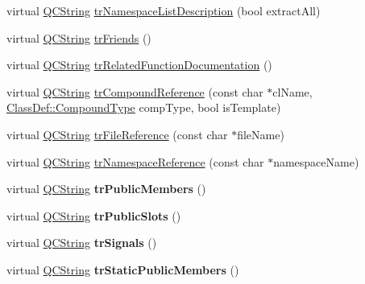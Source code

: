 \begin{DoxyCompactItemize}
\item 
virtual \hyperlink{class_q_c_string}{Q\-C\-String} \hyperlink{class_translator_slovak_aeb5226ccdd672b54940c1705029367da}{tr\-Namespace\-List\-Description} (bool extract\-All)
\item 
virtual \hyperlink{class_q_c_string}{Q\-C\-String} \hyperlink{class_translator_slovak_a77493be94d937cfe7458c6317d792eb6}{tr\-Friends} ()
\item 
virtual \hyperlink{class_q_c_string}{Q\-C\-String} \hyperlink{class_translator_slovak_a5b5913d0d888aaca721ef5a67333bad1}{tr\-Related\-Function\-Documentation} ()
\item 
virtual \hyperlink{class_q_c_string}{Q\-C\-String} \hyperlink{class_translator_slovak_ae4c559d830de6436ef53c6ebcc3b1849}{tr\-Compound\-Reference} (const char $\ast$cl\-Name, \hyperlink{class_class_def_a768a6f0a6fd7e9087ff7971abbcc3f36}{Class\-Def\-::\-Compound\-Type} comp\-Type, bool is\-Template)
\item 
virtual \hyperlink{class_q_c_string}{Q\-C\-String} \hyperlink{class_translator_slovak_ab97b8df22dd810e2260a8cb9b06febbb}{tr\-File\-Reference} (const char $\ast$file\-Name)
\item 
virtual \hyperlink{class_q_c_string}{Q\-C\-String} \hyperlink{class_translator_slovak_a6014867d291ed13bd505e90304b3f7ba}{tr\-Namespace\-Reference} (const char $\ast$namespace\-Name)
\item 
\hypertarget{class_translator_slovak_aa766ee4ea863124dbd2c2cbfe8f615f6}{virtual \hyperlink{class_q_c_string}{Q\-C\-String} {\bfseries tr\-Public\-Members} ()}\label{class_translator_slovak_aa766ee4ea863124dbd2c2cbfe8f615f6}

\item 
\hypertarget{class_translator_slovak_a00352dfc34ae1206bd8572a9c477b8df}{virtual \hyperlink{class_q_c_string}{Q\-C\-String} {\bfseries tr\-Public\-Slots} ()}\label{class_translator_slovak_a00352dfc34ae1206bd8572a9c477b8df}

\item 
\hypertarget{class_translator_slovak_a33921a62881c1973ef5bd381a6e982a4}{virtual \hyperlink{class_q_c_string}{Q\-C\-String} {\bfseries tr\-Signals} ()}\label{class_translator_slovak_a33921a62881c1973ef5bd381a6e982a4}

\item 
\hypertarget{class_translator_slovak_ab354f6c807d8d70502ad5fecdb2cff7c}{virtual \hyperlink{class_q_c_string}{Q\-C\-String} {\bfseries tr\-Static\-Public\-Members} ()}\label{class_translator_slovak_ab354f6c807d8d70502ad5fecdb2cff7c}


\end{DoxyCompactItemize}
